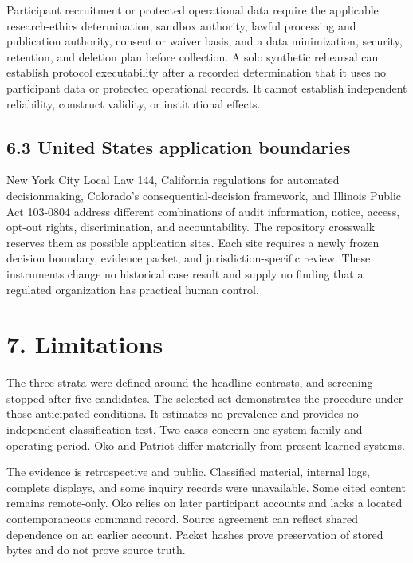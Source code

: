 \documentclass[11pt]{article}
\begin{document}
Participant recruitment or protected operational data require the applicable research-ethics determination, sandbox authority, lawful processing and publication authority, consent or waiver basis, and a data minimization, security, retention, and deletion plan before collection. A solo synthetic rehearsal can establish protocol executability after a recorded determination that it uses no participant data or protected operational records. It cannot establish independent reliability, construct validity, or institutional effects.

\subsection*{6.3 United States application boundaries}

New York City Local Law 144, California regulations for automated decisionmaking, Colorado's consequential-decision framework, and Illinois Public Act 103-0804 address different combinations of audit information, notice, access, opt-out rights, discrimination, and accountability. The repository crosswalk reserves them as possible application sites. Each site requires a newly frozen decision boundary, evidence packet, and jurisdiction-specific review. These instruments change no historical case result and supply no finding that a regulated organization has practical human control.

\section*{7. Limitations}

The three strata were defined around the headline contrasts, and screening stopped after five candidates. The selected set demonstrates the procedure under those anticipated conditions. It estimates no prevalence and provides no independent classification test. Two cases concern one system family and operating period. Oko and Patriot differ materially from present learned systems.

The evidence is retrospective and public. Classified material, internal logs, complete displays, and some inquiry records were unavailable. Some cited content remains remote-only. Oko relies on later participant accounts and lacks a located contemporaneous command record. Source agreement can reflect shared dependence on an earlier account. Packet hashes prove preservation of stored bytes and do not prove source truth.
\end{document}
